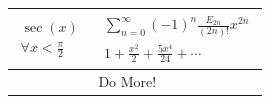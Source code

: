 \begin{tabular}{|l|l|}
    $\begin{array}{l} \sec(x)\\ \forall x<\frac{\pi}{2}\end{array}$ &
      $\begin{array}{l}
        \sum_{n=0}^\infty (-1)^n \frac{E_{2n}}{(2n)!}x^{2n}\\
        1 + \frac{x^2}{2} + \frac{5 x^4}{24} + \dotsb
      \end{array}$\\
    
    \hline

    $\begin{array}{l}   \end{array}$ & Do More! \\

    \hline

  \end{tabular}

